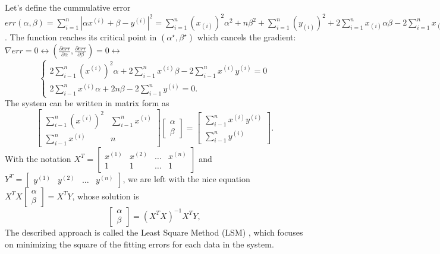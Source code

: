\par Let's define the cummulative error $err(\alpha, \beta)=\sum_{i=1}^{n}{\left| \alpha x^{(i)}+\beta-y^{(i)} \right| ^2}
= \sum_{i=1}^n{(x_{(i)})^2} \alpha^2 + n \beta^2 + \sum_{i=1}^n{(y_{(i)})^2} 
+ 2\sum_{i=1}^n{x_{(i)}} \alpha\beta - 2\sum_{i=1}^n{x_{(i)}}{y_{(i)}} \alpha 
- 2\sum_{i=1}^n{y_{(i)}} \beta$. The function reaches its critical point in $(\alpha^\star, \beta^\star)$ which cancels the gradient:
$\nabla err = 0 \leftrightarrow (\frac{\partial err}{\partial \alpha}, \frac{\partial err}{\partial \beta})=0 \leftrightarrow$
$$
\begin{cases}
2\sum_{i-1}^n{(x^{(i)})^2}\alpha +2\sum_{i-1}^n{x^{(i)}}\beta - 2\sum_{i-1}^n{x^{(i)}y^{(i)}} = 0 \\
2\sum_{i-1}^n{x^{(i)}}\alpha + 2 n \beta - 2\sum_{i-1}^n{y^{(i)}} = 0.
\end{cases}
$$
The system can be written in matrix form as 
$$
\begin{bmatrix}
\sum_{i-1}^n{(x^{(i)})^2} & \sum_{i-1}^n{x^{(i)}} \\
\sum_{i-1}^n{x^{(i)}} & n
\end{bmatrix} \begin{bmatrix}
\alpha \\ \beta
\end{bmatrix} = \begin{bmatrix}
    \sum_{i-1}^n{x^{(i)}y^{(i)}} \\
    \sum_{i-1}^n{y^{(i)}}
\end{bmatrix}.
$$
With the notation $X^T=\begin{bmatrix} x^{(1)} & x^{(2)} &  \dots & x^{(n)} \\ 1 & 1 & \dots & 1 \end{bmatrix}$ and $Y^T=\begin{bmatrix}y^{(1)} & y^{(2)} & \dots & y^{(n)} \end{bmatrix}$, we are left with the nice equation $X^T X \begin{bmatrix}
\alpha \\ \beta \end{bmatrix} = X^T Y$, whose solution is 
$$\begin{bmatrix}\alpha \\ \beta \end{bmatrix} = (X^T X)^{-1} X^T Y,$$
The described approach is called the Least Square Method (LSM) \cite{linregreview}, which focuses on minimizing the square of the fitting errors for each data in the system.

